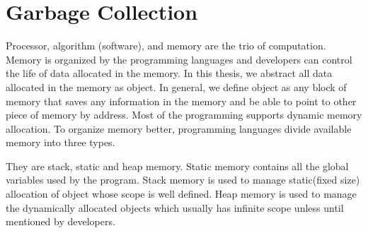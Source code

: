 \begin{comment}
This chapter provides the background information regarding the problem discussed in the thesis. Section
~\ref{intro:gc} describes the fundamental idea behind necessity of garbage collection. Advanced readers can skip the section ~\ref{intro:gc}. Section ~\ref{intro:motv} discusses the advantages of the garbage collection and problem statement of the thesis. Section ~\ref{intro:contr} describes all the contributions of this thesis to solve the problem mentioned in section ~\ref{intro:motv}. Section ~\ref{intro:do} helps the readers to understand how the thesis is organized.
\end{comment}
\section{Garbage Collection}
\label{intro:gc}

Processor, algorithm (software), and memory are the trio of computation. Memory is organized by the programming languages and developers can control the life of data allocated in the memory. In this thesis, we abstract all data allocated in the memory as object. In general, we define object as any block of memory that saves any information in the memory and be able to point to other piece of memory by address. Most of the programming supports dynamic memory allocation. To organize memory better, programming languages divide available memory into three types. 
\begin {comment}
All programming languages are designed to perform complex computations. Computation contain three main ingredients : Processing unit, algorithm, and memory. Processing unit i.e., processor is the unit which performs arithmetic, and logical operations required. Algorithm dictates sequence of operation to performed on the data to get the desired output. Algorithm implemented in a programming language is usually referred as program and collection of programs are called software. Memory saves the input, intermediate results and final output of the computation. 
In this thesis, we are more concerned with object oriented programming languages and object represent user defined dynamically allocated data. Developers write algorithms in a specific programming language. Programming language organizes the memory consumed by the algorithm. Modern programming languages uses three different memories to organize it.
\end{comment} 
They are stack, static and heap memory. Static memory contains all the global variables used by the program. Stack memory is used to manage static(fixed size) allocation of object whose scope is well defined. Heap memory is used to manage the dynamically allocated objects which usually has infinite scope unless until mentioned by developers. 

